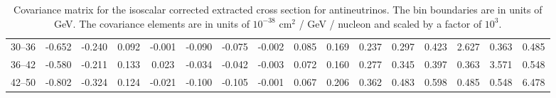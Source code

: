 \begin{table}[tb]
{\begin{tabular}{c|ccccccccccccccc}
    30--36 & -0.652 & -0.240 &  0.092 & -0.001 & -0.090 & -0.075 & -0.002 &  0.085 &  0.169 &  0.237 &  0.297 &  0.423 &  2.627 &  0.363 &  0.485 \\
    36--42 & -0.580 & -0.211 &  0.133 &  0.023 & -0.034 & -0.042 & -0.003 &  0.072 &  0.160 &  0.277 &  0.345 &  0.397 &  0.363 &  3.571 &  0.548 \\
    42--50 & -0.802 & -0.324 &  0.124 & -0.021 & -0.100 & -0.105 & -0.001 &  0.067 &  0.206 &  0.362 &  0.483 &  0.598 &  0.485 &  0.548 &  6.478 \\
    \hline
    \end{tabular} }
\caption{Covariance matrix for the isoscalar corrected extracted cross section for antineutrinos. The bin boundaries are in units of GeV. The covariance elements are in units of $10^{-38}$ cm$^2$ / GeV / nucleon and scaled by a factor of $10^3$.}
\label{cov:RHC-anti-xsec-isoscalar}
\end{table}




